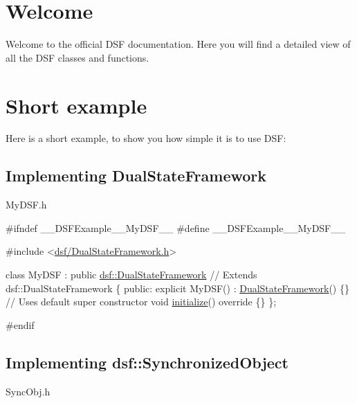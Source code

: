 \hypertarget{index_welcome}{}\section{Welcome}\label{index_welcome}
Welcome to the official D\+S\+F documentation. Here you will find a detailed view of all the D\+S\+F classes and functions.\hypertarget{index_example}{}\section{Short example}\label{index_example}
Here is a short example, to show you how simple it is to use D\+S\+F\+: \hypertarget{index_dsf}{}\subsection{Implementing Dual\+State\+Framework}\label{index_dsf}
My\+D\+S\+F.\+h 
\begin{DoxyCodeInclude}
\textcolor{preprocessor}{#ifndef \_\_DSFExample\_\_MyDSF\_\_}
\textcolor{preprocessor}{#define \_\_DSFExample\_\_MyDSF\_\_}

\textcolor{preprocessor}{#include <\hyperlink{_dual_state_framework_8h}{dsf/DualStateFramework.h}>}

\textcolor{keyword}{class }MyDSF : \textcolor{keyword}{public} \hyperlink{classdsf_1_1_dual_state_framework}{dsf::DualStateFramework} \textcolor{comment}{// Extends dsf::DualStateFramework}
\{
\textcolor{keyword}{public}:
    \textcolor{keyword}{explicit} MyDSF() : \hyperlink{namespacedsf_a68ac3b6a0526bfa7f6a412918afb1841}{DualStateFramework}() \{\} \textcolor{comment}{// Uses default super constructor}
    \textcolor{keywordtype}{void} \hyperlink{classdsf_1_1_dual_state_framework_a809a7bba4148e17ea9a43a0a035383ba}{initialize}()\textcolor{keyword}{ override }\{\}
\};

\textcolor{preprocessor}{#endif}
\end{DoxyCodeInclude}
\hypertarget{index_syncObj}{}\subsection{Implementing dsf\+::\+Synchronized\+Object}\label{index_syncObj}
Sync\+Obj.\+h 

